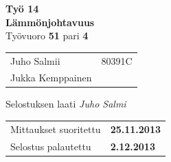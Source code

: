 \documentclass[a4paper,11pt]{article}
\begin{document}
\begin{titlepage}
\pagestyle{empty}
\begin{center}

\vspace*{3cm}
\noindent\LARGE{\textbf{Työ 
%
14
%
\\
%
Lämmönjohtavuus
%
}}\\
\vspace*{2cm}
Työvuoro \LARGE{\textbf{
%
51
%
}} pari \LARGE{\textbf{
%
4
}}\\
\vspace*{1cm}
\large{
\begin{tabular}{l l}
%
Juho Salmii & 80391C\\
Jukka Kemppainen & \\
%
\end{tabular}

\vspace*{1cm}
Selostuksen laati \emph{
%
Juho Salmi
%
} \\
\vspace*{1cm}
\begin{tabular}{l l}
Mittaukset suoritettu & \textbf{
%
25.11.2013
%
}\\
Selostus palautettu & \textbf{
%
2.12.2013
%
}\\
\end{tabular}
}
\end{center}
\end{titlepage}
\end{document}
